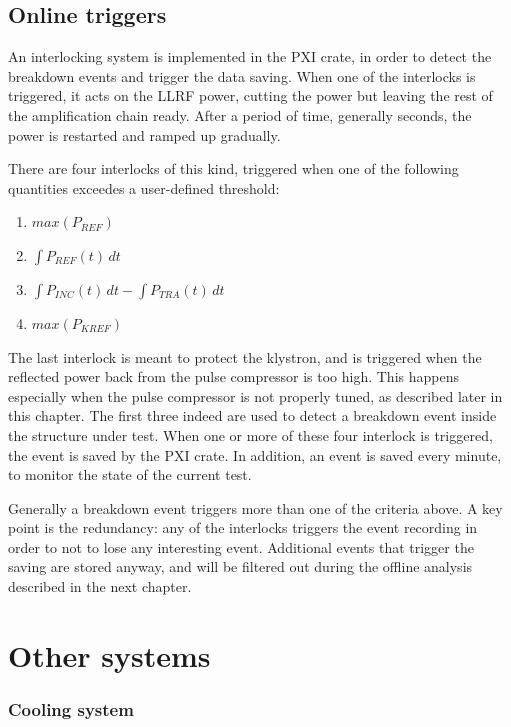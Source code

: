 \subsection[Online triggers]{Online triggers}
 \label{subs:itlk}

An interlocking system is implemented in the PXI crate, in order to detect the breakdown events and trigger the data saving. When one of the interlocks is triggered, it acts on the LLRF power, cutting the power but leaving the rest of the amplification chain ready. After a period of time, generally seconds, the power is restarted and ramped up gradually.

There are four interlocks of this kind, triggered when one of the following quantities exceedes a user-defined threshold:
\begin{enumerate}
\item { $max(P_{REF})$}
\item { $\int P_{REF}(t) \, dt $}
\item { $\int P_{INC}(t)\,dt - \int P_{TRA}(t)\,dt$}
\item { $max(P_{KREF})$}
\end{enumerate}
The last interlock is meant to protect the klystron, and is triggered when the reflected power back from the pulse compressor is too high. This happens especially when the pulse compressor is not properly tuned, as described later in this chapter.
The first three indeed are used to detect a breakdown event inside the structure under test. When one or more of these four interlock is triggered, the event is saved by the PXI crate. In addition, an event is saved every minute, to monitor the state of the current test.

Generally a breakdown event triggers more than one of the criteria above. A key point is the redundancy: any of the interlocks triggers the event recording in order to not to lose any interesting event. Additional events that trigger the saving are stored anyway, and will be filtered out during the offline analysis described in the next chapter.


\section[Other systems]{Other systems}

\subsubsection{Cooling system}

